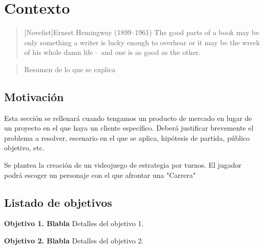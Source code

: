 \chapter{Contexto}

\begin{quotation}[Novelist]{Ernest Hemingway (1899--1961)}
The good parts of a book may be only something a writer is lucky enough to overhear or it may be the wreck of his whole damn life -- and one is as good as the other.
\end{quotation}

\begin{abstract}
Resumen de lo que se explica
\end{abstract}

\section{Motivación}
Esta sección se rellenará cuando tengamos un producto de mercado en lugar de un proyecto en el que haya un cliente específico. Deberá justificar brevemente el problema a resolver, escenario en el que se aplica, hipótesis de partida, público objetivo, etc.

Se plantea la creación de un videojuego de estrategia por turnos. El jugador podrá escoger un personaje con el que afrontar una "Carrera"

\section{Listado de objetivos}

\begin{description}
\item \textbf{Objetivo 1. Blabla} Detalles del objetivo 1.
\item \textbf{Objetivo 2. Blabla} Detalles del objetivo 2.
\end{description}
